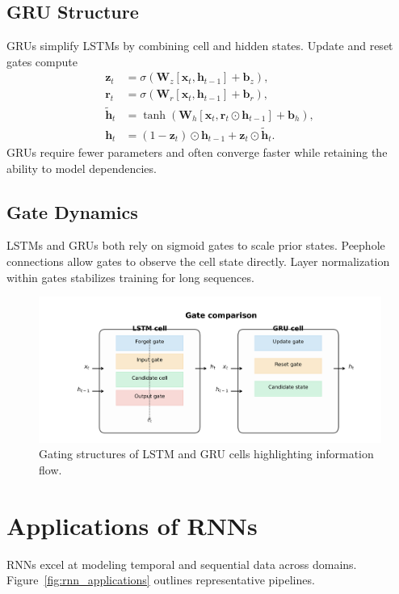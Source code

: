 ﻿\documentclass[12pt]{article}
\begin{document}
\subsection{GRU Structure}
GRUs simplify LSTMs by combining cell and hidden states. Update and reset gates compute
\begin{align}
  \mathbf{z}_t &= \sigma(\mathbf{W}_z [\mathbf{x}_t, \mathbf{h}_{t-1}] + \mathbf{b}_z), \\
  \mathbf{r}_t &= \sigma(\mathbf{W}_r [\mathbf{x}_t, \mathbf{h}_{t-1}] + \mathbf{b}_r), \\
  \tilde{\mathbf{h}}_t &= \tanh(\mathbf{W}_h [\mathbf{x}_t, \mathbf{r}_t \odot \mathbf{h}_{t-1}] + \mathbf{b}_h), \\
  \mathbf{h}_t &= (1 - \mathbf{z}_t) \odot \mathbf{h}_{t-1} + \mathbf{z}_t \odot \tilde{\mathbf{h}}_t.
\end{align}
GRUs require fewer parameters and often converge faster while retaining the ability to model dependencies.

\subsection{Gate Dynamics}
LSTMs and GRUs both rely on sigmoid gates to scale prior states. Peephole connections allow gates to observe the cell state directly. Layer normalization within gates stabilizes training for long sequences.

\begin{figure}[H]
  \centering
  \includegraphics[width=0.85\linewidth]{lstm_gru_gate_comparison.png}
  \caption{Gating structures of LSTM and GRU cells highlighting information flow.}
  \label{fig:lstm_gru}
\end{figure}
\FloatBarrier

\section{Applications of RNNs}
RNNs excel at modeling temporal and sequential data across domains. Figure~\ref{fig:rnn_applications} outlines representative pipelines.
\end{document}
